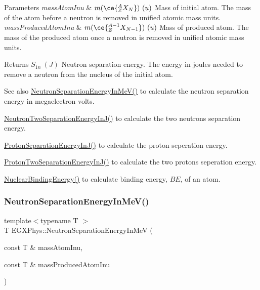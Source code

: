 \begin{DoxyParams}{Parameters}
{\em mass\+Atom\+Inu} & $m(\ce{ ^{A}_{Z}X_{N} })\ (u)$ Mass of initial atom. The mass of the atom before a neutron is removed in unified atomic mass units. \\
\hline
{\em mass\+Produced\+Atom\+Inu} & $m(\ce{ ^{A-1}_{Z}X_{N-1} })\ (u)$ Mass of produced atom. The mass of the produced atom once a neutron is removed in unified atomic mass units. \\
\hline
\end{DoxyParams}
\begin{DoxyReturn}{Returns}
$S_{1n}\ (J)$ Neutron separation energy. The energy in joules needed to remove a neutron from the nucleus of the initial atom. 
\end{DoxyReturn}
\begin{DoxySeeAlso}{See also}
\hyperlink{group___nuclear_separation_energy_ga66133edb5809c81dd9fd60e09ebbef79}{Neutron\+Separation\+Energy\+In\+Me\+V()} to calculate the neutron separation energy in megaelectron volts. 

\hyperlink{group___nuclear_separation_energy_ga293ac9428420a0adf4235048dbe529b4}{Neutron\+Two\+Separation\+Energy\+In\+J()} to calculate the two neutrons separation energy. 

\hyperlink{group___nuclear_separation_energy_ga4274d8f5a3860169fd81970707eb582a}{Proton\+Separation\+Energy\+In\+J()} to calculate the proton seperation energy. 

\hyperlink{group___nuclear_separation_energy_gad7c1d4a32daa8aaa53c5fce37c421f82}{Proton\+Two\+Separation\+Energy\+In\+J()} to calculate the two protons seperation energy. 

\hyperlink{group___nuclear_binding_energy_gafea41a3c21704414394c3204b35aba98}{Nuclear\+Binding\+Energy()} to calculate binding energy, $BE$, of an atom. 
\end{DoxySeeAlso}
\mbox{\label{group___nuclear_separation_energy_ga66133edb5809c81dd9fd60e09ebbef79}} 
\subsubsection{\texorpdfstring{Neutron\+Separation\+Energy\+In\+Me\+V()}{NeutronSeparationEnergyInMeV()}}
{\footnotesize\ttfamily template$<$typename T $>$ \\
T E\+G\+X\+Phys\+::\+Neutron\+Separation\+Energy\+In\+MeV (\begin{DoxyParamCaption}\item[{const T \&}]{mass\+Atom\+Inu,  }\item[{const T \&}]{mass\+Produced\+Atom\+Inu }\end{DoxyParamCaption})}



